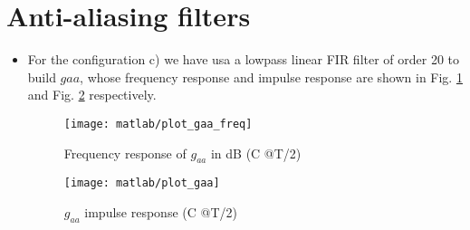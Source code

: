 \documentclass[a4paper,oneside]{article}
\begin{document}
\section{Anti-aliasing filters}
\begin{itemize}
\item 

For the configuration c) we have usa a lowpass linear FIR filter of order 20 to build $gaa$, whose frequency response and impulse response are shown in Fig. \ref{plot:Gaa2} and Fig. \ref{plot:gaa2} respectively. 
\begin{figure}[h]
  \centering
  \texttt{[image: matlab/plot\_gaa\_freq]}
  \caption{Frequency response of $g_{aa}$ in dB (C @T/2)}
  \label{plot:Gaa2}
\end{figure}
\begin{figure}[h]
  \centering
  \texttt{[image: matlab/plot\_gaa]}
  \caption{$g_{aa}$ impulse response (C @T/2)}
  \label{plot:gaa2}
\end{figure}

 


\end{itemize}
\end{document}
